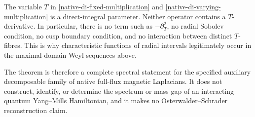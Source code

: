 \begin{remark}
The variable \(T\) in
\eqref{native-di-fixed-multiplication} and
\eqref{native-di-varying-multiplication} is a direct-integral parameter.
Neither operator contains a \(T\)-derivative.  In particular, there is no
term such as \(-\partial_T^2\), no radial Sobolev condition, no cusp
boundary condition, and no interaction between distinct \(T\)-fibres.
This is why characteristic functions of radial intervals legitimately
occur in the maximal-domain Weyl sequences above.

The theorem is therefore a complete spectral statement for the specified
auxiliary decomposable family of native full-flux magnetic Laplacians.  It
does not construct, identify, or determine the spectrum or mass gap of an
interacting quantum Yang--Mills Hamiltonian, and it makes no
Osterwalder--Schrader reconstruction claim.
\end{remark}
